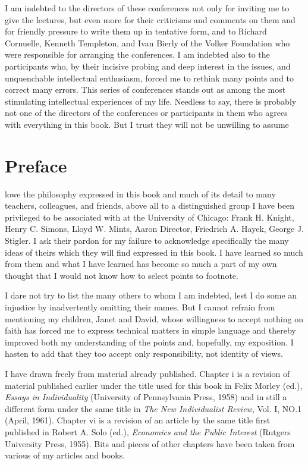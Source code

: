 \documentclass[11pt,openany]{book}
\newcommand{\bookchapterplain}[1]{%
  \clearpage\phantomsection
  \chapter*{#1}%
  \addcontentsline{toc}{chapter}{#1}%
  \markboth{#1}{#1}\thispagestyle{plain}}
\begin{document}
I am indebted to the directors of these conferences not only for inviting me to give the lectures, but even more for their criticisms and comments on them and for friendly pressure to write them up in tentative form, and to Richard Cornuelle, Kenneth Templeton, and Ivan Bierly of the Volker Foundation who were responsible for arranging the conferences. I am indebted also to the participants who, by their incisive probing and deep interest in the issues, and unquenchable intellectual enthusiasm, forced me to rethink many points and to correct many errors. This series of conferences stands out as among the most stimulating intellectual experiences of my life. Needless to say, there is probably not one of the directors of the conferences or participants in them who agrees with everything in this book. But I trust they will not be unwilling to assume

\bookchapterplain{Preface}

lowe the philosophy expressed in this book and much of its detail to many teachers, colleagues, and friends, above all to a distinguished group I have been privileged to be associated with at the University of Chicago: Frank H. Knight, Henry C. Simons, Lloyd W. Mints, Aaron Director, Friedrich A. Hayek, George J. Stigler. I ask their pardon for my failure to acknowledge specifically the many ideas of theirs which they will find expressed in this book. I have learned so much from them and what I have learned has become so much a part of my own thought that I would not know how to select points to footnote.

I dare not try to list the many others to whom I am indebted, lest I do some an injustice by inadvertently omitting their names. But I cannot refrain from mentioning my children, Janet and David, whose willingness to accept nothing on faith has forced me to express technical matters in simple language and thereby improved both my understanding of the points and, hopefully, my exposition. I hasten to add that they too accept only responsibility, not identity of views.

I have drawn freely from material already published. Chapter i is a revision of material published earlier under the title used for this book in Felix Morley (ed.), \emph{Essays in Individuality} (University of Pennsylvania Press, 1958) and in still a different form under the same title in \emph{The New Individualist Review}, Vol. I, NO.1 (April, 1961). Chapter vi is a revision of an article by the same title first published in Robert A. Solo (ed.), \emph{Economics and the Public Interest} (Rutgers University Press, 1955). Bits and pieces of other chapters have been taken from various of my articles and books.
\end{document}
